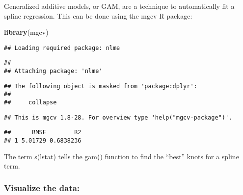 \documentclass[]{article}
\newenvironment{Shaded}{\begin{snugshade}}{\end{snugshade}}
\newcommand{\CommentTok}[1]{\textcolor[rgb]{0.56,0.35,0.01}{\textit{#1}}}
\newcommand{\DataTypeTok}[1]{\textcolor[rgb]{0.13,0.29,0.53}{#1}}
\newcommand{\KeywordTok}[1]{\textcolor[rgb]{0.13,0.29,0.53}{\textbf{#1}}}
\newcommand{\NormalTok}[1]{#1}
\newcommand{\OperatorTok}[1]{\textcolor[rgb]{0.81,0.36,0.00}{\textbf{#1}}}
\newcommand{\StringTok}[1]{\textcolor[rgb]{0.31,0.60,0.02}{#1}}
\begin{document}
Generalized additive models, or GAM, are a technique to automatically
fit a spline regression. This can be done using the mgcv R package:

\begin{Shaded}
\begin{Highlighting}[]
\KeywordTok{library}\NormalTok{(mgcv)}
\end{Highlighting}
\end{Shaded}

\begin{verbatim}
## Loading required package: nlme
\end{verbatim}

\begin{verbatim}
## 
## Attaching package: 'nlme'
\end{verbatim}

\begin{verbatim}
## The following object is masked from 'package:dplyr':
## 
##     collapse
\end{verbatim}

\begin{verbatim}
## This is mgcv 1.8-28. For overview type 'help("mgcv-package")'.
\end{verbatim}

\begin{Shaded}
\end{Shaded}

\begin{verbatim}
##      RMSE        R2
## 1 5.01729 0.6838236
\end{verbatim}

The term s(lstat) tells the gam() function to find the ``best'' knots
for a spline term.

\hypertarget{visualize-the-data-1}{%
\subsubsection{Visualize the data:}\label{visualize-the-data-1}}
\end{document}
